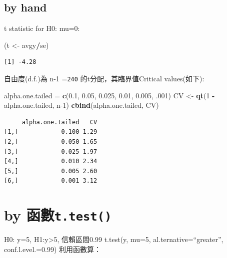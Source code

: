 \documentclass[]{book}
\newenvironment{Shaded}{\begin{snugshade}}{\end{snugshade}}
\newcommand{\CommentTok}[1]{\textcolor[rgb]{0.56,0.35,0.01}{\textit{#1}}}
\newcommand{\DataTypeTok}[1]{\textcolor[rgb]{0.13,0.29,0.53}{#1}}
\newcommand{\DecValTok}[1]{\textcolor[rgb]{0.00,0.00,0.81}{#1}}
\newcommand{\FloatTok}[1]{\textcolor[rgb]{0.00,0.00,0.81}{#1}}
\newcommand{\KeywordTok}[1]{\textcolor[rgb]{0.13,0.29,0.53}{\textbf{#1}}}
\newcommand{\NormalTok}[1]{#1}
\newcommand{\OperatorTok}[1]{\textcolor[rgb]{0.81,0.36,0.00}{\textbf{#1}}}
\newcommand{\StringTok}[1]{\textcolor[rgb]{0.31,0.60,0.02}{#1}}
\theoremstyle{definition}
\theoremstyle{definition}
\theoremstyle{definition}
\theoremstyle{remark}
\begin{document}
\hypertarget{by-hand}{%
\subsection{by hand}\label{by-hand}}

t statistic for H0: mu=0:

\begin{Shaded}
\begin{Highlighting}[]
\NormalTok{(t <-}\StringTok{ }\NormalTok{avgy}\OperatorTok{/}\NormalTok{se)}
\end{Highlighting}
\end{Shaded}

\begin{verbatim}
[1] -4.28
\end{verbatim}

自由度(d.f.)為 n-1 =\texttt{240} 的t分配，其臨界值Critical values(如下):

\begin{Shaded}
\begin{Highlighting}[]
\NormalTok{alpha.one.tailed =}\StringTok{ }\KeywordTok{c}\NormalTok{(}\FloatTok{0.1}\NormalTok{, }\FloatTok{0.05}\NormalTok{, }\FloatTok{0.025}\NormalTok{, }\FloatTok{0.01}\NormalTok{, }\FloatTok{0.005}\NormalTok{, }\FloatTok{.001}\NormalTok{)}
\NormalTok{CV <-}\StringTok{ }\KeywordTok{qt}\NormalTok{(}\DecValTok{1} \OperatorTok{-}\StringTok{ }\NormalTok{alpha.one.tailed, n}\DecValTok{-1}\NormalTok{)}
\KeywordTok{cbind}\NormalTok{(alpha.one.tailed, CV)}
\end{Highlighting}
\end{Shaded}

\begin{verbatim}
     alpha.one.tailed   CV
[1,]            0.100 1.29
[2,]            0.050 1.65
[3,]            0.025 1.97
[4,]            0.010 2.34
[5,]            0.005 2.60
[6,]            0.001 3.12
\end{verbatim}

\hypertarget{by-t.test}{%
\section{\texorpdfstring{by
函數\texttt{t.test()}}{by 函數t.test()}}\label{by-t.test}}

H0: y=5, H1:y\textgreater{}5, 信賴區間0.99 t.test(y, mu=5,
al.ternative=``greater'', conf.l.evel.=0.99) 利用函數算：

\begin{Shaded}
\end{Shaded}
\end{document}
